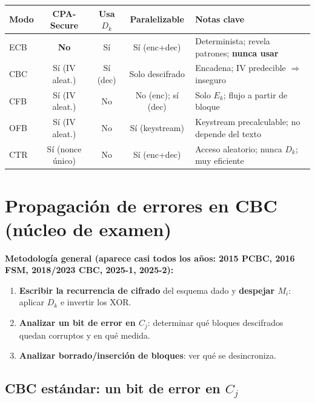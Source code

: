 \documentclass[11pt,a4paper]{article}
\begin{document}
\begin{center}
\renewcommand{\arraystretch}{1.3}
\begin{tabular}{@{}lcccp{5.2cm}@{}}
\toprule
\textbf{Modo} & \textbf{CPA-Secure} & \textbf{Usa $D_k$} &
\textbf{Paralelizable} & \textbf{Notas clave} \\
\midrule
ECB & \textbf{No} & S\'i & S\'i (enc+dec)
    & Determinista; revela patrones; \textbf{nunca usar} \\
CBC & S\'i (IV aleat.) & S\'i (dec) & Solo descifrado
    & Encadena; IV predecible $\Rightarrow$ inseguro \\
CFB & S\'i (IV aleat.) & No & No (enc); s\'i (dec)
    & Solo $E_k$; flujo a partir de bloque \\
OFB & S\'i (IV aleat.) & No & S\'i (keystream)
    & Keystream precalculable; no depende del texto \\
CTR & S\'i (nonce \'unico) & No & S\'i (enc+dec)
    & Acceso aleatorio; nunca $D_k$; muy eficiente \\
\bottomrule
\end{tabular}
\end{center}

\section{Propagaci\'on de errores en CBC (n\'ucleo de examen)}

\begin{examen}
  \textbf{Metodolog\'ia general (aparece casi todos los a\~nos: 2015 PCBC, 2016
  FSM, 2018/2023 CBC, 2025-1, 2025-2):}
  \begin{enumerate}[nosep]
    \item \textbf{Escribir la recurrencia de cifrado} del esquema dado y
      \textbf{despejar $M_i$}: aplicar $D_k$ e invertir los XOR.
    \item \textbf{Analizar un bit de error en $C_j$}: determinar qu\'e bloques
      descifrados quedan corruptos y en qu\'e medida.
    \item \textbf{Analizar borrado/inserci\'on de bloques}: ver qu\'e se
      desincroniza.
  \end{enumerate}
\end{examen}

\subsection{CBC est\'andar: un bit de error en $C_j$}
\end{document}

